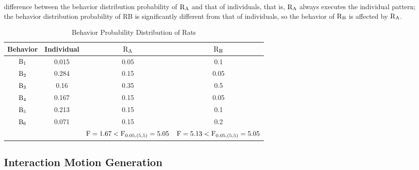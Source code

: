 difference between the behavior distribution probability of $\rm R_A$ and that
of individuals, that is, $\rm R_A$ always executes the individual pattern; the
behavior distribution probability of RB is significantly different from that of
individuals, so the behavior of $\rm R_B$ is affected by $\rm R_A$.
\begin{table}[b]
    \caption{Behavior Probability Distribution of Rats}
    \centering
    \begin{tabular}{cccc}
            \hline
            Behavior & Individual & $\rm R_A$ & $\rm R_B$ \\
            \hline
            $\rm B_1$ & 0.015 & 0.05 & 0.1 \\
            $\rm B_2$ & 0.284 & 0.15 & 0.05 \\
            $\rm B_3$ & 0.16 & 0.35 & 0.5 \\
            $\rm B_4$ & 0.167 & 0.15 & 0.05 \\
            $\rm B_5$ & 0.213 & 0.15 & 0.1 \\
            $\rm B_6$ & 0.071 & 0.15 & 0.2 \\
             &  & ${\rm F}=1.67<{\rm F}_{0.05,(5,5)}=5.05$ & ${\rm F}=5.13<{\rm F}_{0.05,(5,5)}=5.05$ \\
            \hline
            \end{tabular}
    \label{table:Behavior Probability Distribution of Rats}
\end{table}

\subsection{Interaction Motion Generation}

